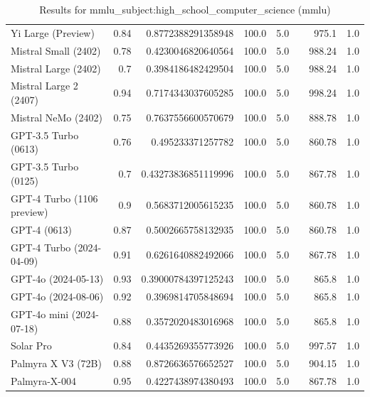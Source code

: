 \begin{table}[htp]
{\begin{tabular}{lrrrrrrr}
Yi Large (Preview) & 0.84 & 0.8772388291358948 & 100.0 & 5.0 &  & 975.1 & 1.0 \\
Mistral Small (2402) & 0.78 & 0.4230046820640564 & 100.0 & 5.0 &  & 988.24 & 1.0 \\
Mistral Large (2402) & 0.7 & 0.3984186482429504 & 100.0 & 5.0 &  & 988.24 & 1.0 \\
Mistral Large 2 (2407) & 0.94 & 0.7174343037605285 & 100.0 & 5.0 &  & 998.24 & 1.0 \\
Mistral NeMo (2402) & 0.75 & 0.7637556600570679 & 100.0 & 5.0 &  & 888.78 & 1.0 \\
GPT-3.5 Turbo (0613) & 0.76 & 0.495233371257782 & 100.0 & 5.0 &  & 860.78 & 1.0 \\
GPT-3.5 Turbo (0125) & 0.7 & 0.43273836851119996 & 100.0 & 5.0 &  & 867.78 & 1.0 \\
GPT-4 Turbo (1106 preview) & 0.9 & 0.5683712005615235 & 100.0 & 5.0 &  & 860.78 & 1.0 \\
GPT-4 (0613) & 0.87 & 0.5002665758132935 & 100.0 & 5.0 &  & 860.78 & 1.0 \\
GPT-4 Turbo (2024-04-09) & 0.91 & 0.6261640882492066 & 100.0 & 5.0 &  & 867.78 & 1.0 \\
GPT-4o (2024-05-13) & 0.93 & 0.39000784397125243 & 100.0 & 5.0 &  & 865.8 & 1.0 \\
GPT-4o (2024-08-06) & 0.92 & 0.3969814705848694 & 100.0 & 5.0 &  & 865.8 & 1.0 \\
GPT-4o mini (2024-07-18) & 0.88 & 0.3572020483016968 & 100.0 & 5.0 &  & 865.8 & 1.0 \\
Solar Pro & 0.84 & 0.4435269355773926 & 100.0 & 5.0 &  & 997.57 & 1.0 \\
Palmyra X V3 (72B) & 0.88 & 0.8726636576652527 & 100.0 & 5.0 &  & 904.15 & 1.0 \\
Palmyra-X-004 & 0.95 & 0.4227438974380493 & 100.0 & 5.0 &  & 867.78 & 1.0 \\
\bottomrule
\end{tabular}}
\caption{Results for mmlu_subject:high_school_computer_science (mmlu)}
\label{fig:mmlu_subject:high_school_computer_science (mmlu)}
\end{table}